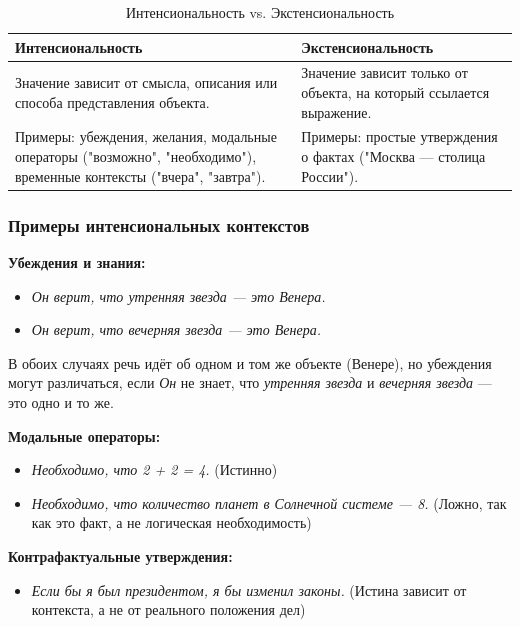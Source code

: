 \documentclass[a4paper, 12pt]{article}
\begin{document}
\begin{table}[h]
    \centering
    \caption{Интенсиональность vs. Экстенсиональность}
    \label{tab:equalwidth}
    \begin{tabularx}{\textwidth}{|X|X|}
        \hline
        \textbf{Интенсиональность} & \textbf{Экстенсиональность} \\
        \hline
        Значение зависит от смысла, описания или способа представления объекта. & Значение зависит только от объекта, на который ссылается выражение. \\
        \hline
        Примеры: убеждения, желания, модальные операторы ("возможно", "необходимо"), временные контексты ("вчера", "завтра"). & Примеры: простые утверждения о фактах ("Москва — столица России"). \\
        \hline
    \end{tabularx}
\end{table}


\subsubsection{Примеры интенсиональных контекстов}


\textbf{Убеждения и знания:}

\begin{itemize} 
 \item \textit{Он верит, что утренняя звезда — это Венера.}
 \item \textit{Он верит, что вечерняя звезда — это Венера.}
\end{itemize} 

В обоих случаях речь идёт об одном и том же объекте (Венере), но убеждения могут различаться, если \textit{Он} не знает, что \textit{утренняя звезда} и \textit{вечерняя звезда} — это одно и то же.

\textbf{Модальные операторы:}

\begin{itemize} 
 \item \textit{Необходимо, что 2 + 2 = 4.} (Истинно)
 \item \textit{Необходимо, что количество планет в Солнечной системе — 8.} (Ложно, так как это факт, а не логическая необходимость)
\end{itemize} 


\textbf{Контрафактуальные утверждения:}

\begin{itemize} 
 \item \textit{Если бы я был президентом, я бы изменил законы.} (Истина зависит от контекста, а не от реального положения дел)
\end{itemize} 
\end{document}
